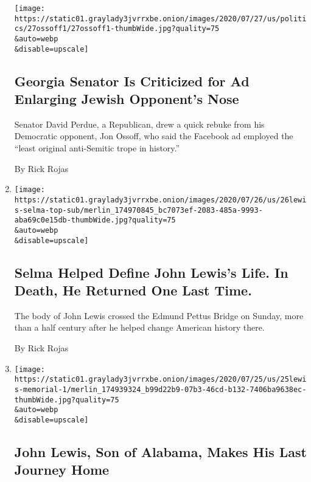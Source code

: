 \begin{enumerate}
  \texttt{[image: https://static01.graylady3jvrrxbe.onion/images/2020/07/27/us/politics/27ossoff1/27ossoff1-thumbWide.jpg?quality=75\\\&auto=webp\\\&disable=upscale]}

  \hypertarget{georgia-senator-is-criticized-for-ad-enlarging-jewish-opponents-nose}{%
  \subsection{Georgia Senator Is Criticized for Ad Enlarging Jewish
  Opponent's
  Nose}\label{georgia-senator-is-criticized-for-ad-enlarging-jewish-opponents-nose}}

  Senator David Perdue, a Republican, drew a quick rebuke from his
  Democratic opponent, Jon Ossoff, who said the Facebook ad employed the
  ``least original anti-Semitic trope in history.''

  By Rick Rojas
\item
  \href{/2020/07/26/us/selma-john-lewis-memorial.html}{}

  \texttt{[image: https://static01.graylady3jvrrxbe.onion/images/2020/07/26/us/26lewis-selma-top-sub/merlin\_174970845\_bc7073ef-2083-485a-9993-aba69c0e15db-thumbWide.jpg?quality=75\\\&auto=webp\\\&disable=upscale]}

  \hypertarget{selma-helped-define-john-lewiss-life-in-death-he-returned-one-last-time}{%
  \subsection{Selma Helped Define John Lewis's Life. In Death, He
  Returned One Last
  Time.}\label{selma-helped-define-john-lewiss-life-in-death-he-returned-one-last-time}}

  The body of John Lewis crossed the Edmund Pettus Bridge on Sunday,
  more than a half century after he helped change American history
  there.

  By Rick Rojas
\item
  \href{/2020/07/25/us/john-lewis-memorial-service.html}{}

  \texttt{[image: https://static01.graylady3jvrrxbe.onion/images/2020/07/25/us/25lewis-memorial-1/merlin\_174939324\_b99d22b9-07b3-46cd-b132-7406ba9638ec-thumbWide.jpg?quality=75\\\&auto=webp\\\&disable=upscale]}

  \hypertarget{john-lewis-son-of-alabama-makes-his-last-journey-home}{%
  \subsection{John Lewis, Son of Alabama, Makes His Last Journey
  Home}\label{john-lewis-son-of-alabama-makes-his-last-journey-home}}


\end{enumerate}
